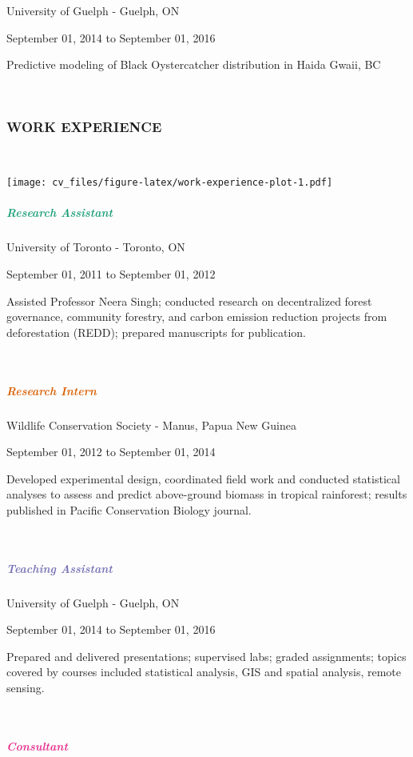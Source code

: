 \documentclass[
]{article}
\begin{document}
University of Guelph - Guelph, ON

September 01, 2014 to September 01, 2016

Predictive modeling of Black Oystercatcher distribution in Haida Gwaii,
BC

~

\hypertarget{work-experience}{%
\subsubsection{WORK EXPERIENCE}\label{work-experience}}

~

\texttt{[image: cv\_files/figure-latex/work-experience-plot-1.pdf]}

\hypertarget{section-2}{%
\subparagraph{\texorpdfstring{\textcolor{#1B9E77}{Research Assistant}}{}}\label{section-2}}

University of Toronto - Toronto, ON

September 01, 2011 to September 01, 2012

Assisted Professor Neera Singh; conducted research on decentralized
forest governance, community forestry, and carbon emission reduction
projects from deforestation (REDD); prepared manuscripts for
publication.

~

\hypertarget{section-3}{%
\subparagraph{\texorpdfstring{\textcolor{#D95F02}{Research Intern}}{}}\label{section-3}}

Wildlife Conservation Society - Manus, Papua New Guinea

September 01, 2012 to September 01, 2014

Developed experimental design, coordinated field work and conducted
statistical analyses to assess and predict above-ground biomass in
tropical rainforest; results published in Pacific Conservation Biology
journal.

~

\hypertarget{section-4}{%
\subparagraph{\texorpdfstring{\textcolor{#7570B3}{Teaching Assistant}}{}}\label{section-4}}

University of Guelph - Guelph, ON

September 01, 2014 to September 01, 2016

Prepared and delivered presentations; supervised labs; graded
assignments; topics covered by courses included statistical analysis,
GIS and spatial analysis, remote sensing.

~

\hypertarget{section-5}{%
\subparagraph{\texorpdfstring{\textcolor{#E7298A}{Consultant}}{}}\label{section-5}}
\end{document}
